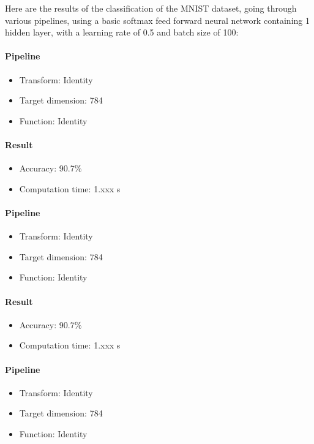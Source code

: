 \documentclass[11pt,a4paper]{article}
\begin{document}
	
	Here are the results of the classification of the MNIST dataset, going through various pipelines, using a basic softmax feed forward neural network containing 1 hidden layer, with a learning rate of 0.5 and batch size of 100:
	
	
	\paragraph{Pipeline}
	\begin{itemize}
			\item Transform: Identity
			\item Target dimension: 784
			\item Function: Identity
	\end{itemize}
	 \paragraph{Result}
	 \begin{itemize}
			\item Accuracy: 90.7\%
			\item Computation time: 1.xxx s
	\end{itemize}



	\paragraph{Pipeline}
	\begin{itemize}
		\item Transform: Identity
		\item Target dimension: 784
		\item Function: Identity
	\end{itemize}
	\paragraph{Result}
	\begin{itemize}
		\item Accuracy: 90.7\%
		\item Computation time: 1.xxx s
	\end{itemize}
	
	
	
		\paragraph{Pipeline}
		\begin{itemize}
			\item Transform: Identity
			\item Target dimension: 784
			\item Function: Identity
		\end{itemize}
\end{document}
